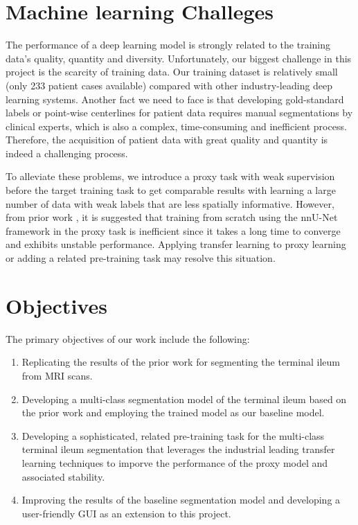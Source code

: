 \section{Machine learning Challeges}
The performance of a deep learning model is strongly related to the training data's quality, quantity and diversity. Unfortunately, our biggest challenge in this project is the scarcity of training data. Our training dataset is relatively small (only 233 patient cases available) compared with other industry-leading deep learning systems. Another fact we need to face is that developing gold-standard labels or point-wise centerlines for patient data requires manual segmentations by clinical experts, which is also a complex, time-consuming and inefficient process. Therefore, the acquisition of patient data with great quality and quantity is indeed a challenging process. \medskip

\noindent To alleviate these problems, we introduce a proxy task with weak supervision before the target training task to get comparable results with learning a large number of data with weak labels that are less spatially informative. However, from prior work \cite{Ali2022}, it is suggested that training from scratch using the nnU-Net framework in the proxy task is inefficient since it takes a long time to converge and exhibits unstable performance. Applying transfer learning to proxy learning \cite{jang2021effectiveness} or adding a related pre-training task may resolve this situation.

\section{Objectives}
The primary objectives of our work include the following:
\begin{enumerate}
    \item Replicating the results of the prior work \cite{Ali2022} for segmenting the terminal ileum from MRI scans.
    \item Developing a multi-class segmentation model of the terminal ileum based on the prior work and employing the trained model as our baseline model. 
    \item Developing a sophisticated, related pre-training task for the multi-class terminal ileum segmentation that leverages the industrial leading transfer learning techniques to imporve the performance of the proxy model and associated stability.
    \item Improving the results of the baseline segmentation model and developing a user-friendly GUI as an extension to this project.
\end{enumerate}